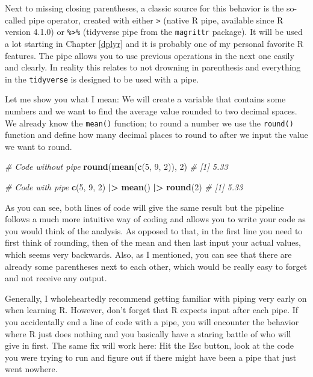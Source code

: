 \documentclass[
]{book}
\newenvironment{Shaded}{\begin{snugshade}}{\end{snugshade}}
\newcommand{\CommentTok}[1]{\textcolor[rgb]{0.56,0.35,0.01}{\textit{#1}}}
\newcommand{\DecValTok}[1]{\textcolor[rgb]{0.00,0.00,0.81}{#1}}
\newcommand{\FunctionTok}[1]{\textcolor[rgb]{0.13,0.29,0.53}{\textbf{#1}}}
\newcommand{\NormalTok}[1]{#1}
\newcommand{\SpecialCharTok}[1]{\textcolor[rgb]{0.81,0.36,0.00}{\textbf{#1}}}
\begin{document}
Next to missing closing parentheses, a classic source for this behavior is the so-called pipe operator, created with either \texttt{\textbar{}\textgreater{}} (native R pipe, available since R version 4.1.0) or \texttt{\%\textgreater{}\%} (tidyverse pipe from the \texttt{magrittr} package).
It will be used a lot starting in Chapter \ref{dplyr} and it is probably one of my personal favorite R features.
The pipe allows you to use previous operations in the next one easily and clearly.
In reality this relates to not drowning in parenthesis and everything in the \texttt{tidyverse} is designed to be used with a pipe.

Let me show you what I mean: We will create a variable that contains some numbers and we want to find the average value rounded to two decimal spaces.
We already know the \texttt{mean()} function; to round a number we use the \texttt{round()} function and define how many decimal places to round to after we input the value we want to round.

\begin{Shaded}
\begin{Highlighting}[]
\CommentTok{\# Code without pipe}
\FunctionTok{round}\NormalTok{(}\FunctionTok{mean}\NormalTok{(}\FunctionTok{c}\NormalTok{(}\DecValTok{5}\NormalTok{, }\DecValTok{9}\NormalTok{, }\DecValTok{2}\NormalTok{)), }\DecValTok{2}\NormalTok{)}
\CommentTok{\# [1] 5.33}

\CommentTok{\# Code with pipe}
\FunctionTok{c}\NormalTok{(}\DecValTok{5}\NormalTok{, }\DecValTok{9}\NormalTok{, }\DecValTok{2}\NormalTok{) }\SpecialCharTok{|\textgreater{}} \FunctionTok{mean}\NormalTok{() }\SpecialCharTok{|\textgreater{}} \FunctionTok{round}\NormalTok{(}\DecValTok{2}\NormalTok{)}
\CommentTok{\# [1] 5.33}
\end{Highlighting}
\end{Shaded}

As you can see, both lines of code will give the same result but the pipeline follows a much more intuitive way of coding and allows you to write your code as you would think of the analysis.
As opposed to that, in the first line you need to first think of rounding, then of the mean and then last input your actual values, which seems very backwards.
Also, as I mentioned, you can see that there are already some parentheses next to each other, which would be really easy to forget and not receive any output.

Generally, I wholeheartedly recommend getting familiar with piping very early on when learning R.
However, don't forget that R expects input after each pipe.
If you accidentally end a line of code with a pipe, you will encounter the behavior where R just does nothing and you basically have a staring battle of who will give in first.
The same fix will work here: Hit the Esc button, look at the code you were trying to run and figure out if there might have been a pipe that just went nowhere.
\end{document}
